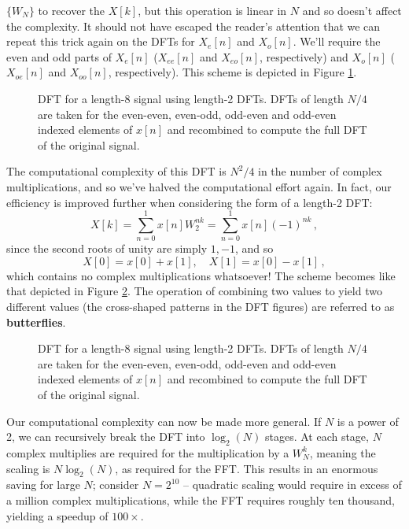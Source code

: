 $\{W_N\}$ to recover the $X[k]$, but this operation is linear in $N$ and so
doesn't affect the complexity. It should not have escaped the reader's attention
that we can repeat this trick again on the DFTs for $X_e[n]$ and $X_o[n]$.
We'll require the even and odd parts of $X_e[n]$ ($X_{ee}[n]$ and $X_{eo}[n]$,
respectively) and $X_o[n]$ ($X_{oe}[n]$ and $X_{oo}[n]$, respectively).
This scheme is depicted in Figure \ref{fig::lecture_11_dft_two}.
%
\begin{figure}[!htb]
  
  \caption{DFT for a length-8 signal using length-2 DFTs. DFTs of length $N/4$
    are taken for the even-even, even-odd, odd-even and odd-even indexed elements
    of $x[n]$ and recombined to compute the full DFT of the original signal.
  }
  \label{fig::lecture_11_dft_two}
\end{figure}
%
The computational complexity of this DFT is $N^2 / 4$ in the number of complex
multiplications, and so we've halved the computational effort again. In fact,
our efficiency is improved further when considering the form of a length-2 DFT:
%
\begin{displaymath}
  X[k] = \sum_{n=0}^1 x[n]W_2^{nk} = \sum_{n=0}^1 x[n](-1)^{nk} \,,
\end{displaymath}
%
since the second roots of unity are simply $1,-1$, and so
%
\begin{displaymath}
  X[0] = x[0] + x[1],\quad X[1] = x[0] - x[1] \,,
\end{displaymath}
%
which contains no complex multiplications whatsoever! The scheme becomes
like that depicted in Figure \ref{fig::lecture_11_dft_three}. The operation
of combining two values to yield two different values (the cross-shaped patterns
in the DFT figures) are referred to as \textbf{butterflies}.  
%
\begin{figure}[!htb]
  
  \caption{DFT for a length-8 signal using length-2 DFTs. DFTs of length $N/4$
    are taken for the even-even, even-odd, odd-even and odd-even indexed elements
    of $x[n]$ and recombined to compute the full DFT of the original signal.
  }
  \label{fig::lecture_11_dft_three}
\end{figure}
%
Our computational complexity can now be made more general. If $N$ is a power of 2,
we can recursively break the DFT into $\log_2(N)$ stages. At each stage, $N$ complex
multiplies are required for the multiplication by a $W_N^k$, meaning the scaling is
$N\log_2(N)$, as required for the FFT. This results in an enormous saving for large
$N$; consider $N=2^{10}$ -- quadratic scaling would require in excess of a million
complex multiplications, while the FFT requires roughly ten thousand, yielding a
speedup of $100\times$.\\

